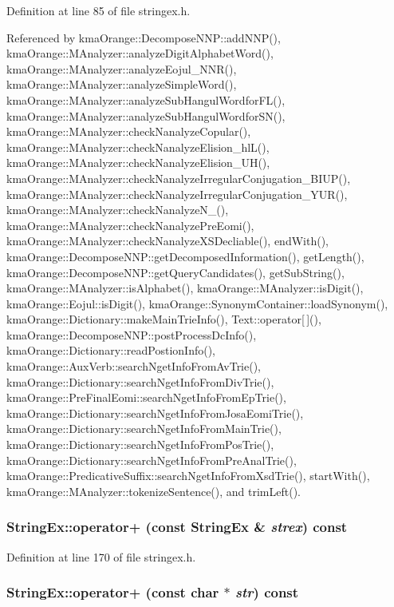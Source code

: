Definition at line 85 of file stringex.h.

Referenced by kmaOrange::DecomposeNNP::addNNP(), kmaOrange::MAnalyzer::analyzeDigitAlphabetWord(), kmaOrange::MAnalyzer::analyzeEojul\_\-NNR(), kmaOrange::MAnalyzer::analyzeSimpleWord(), kmaOrange::MAnalyzer::analyzeSubHangulWordforFL(), kmaOrange::MAnalyzer::analyzeSubHangulWordforSN(), kmaOrange::MAnalyzer::checkNanalyzeCopular(), kmaOrange::MAnalyzer::checkNanalyzeElision\_\-hlL(), kmaOrange::MAnalyzer::checkNanalyzeElision\_\-UH(), kmaOrange::MAnalyzer::checkNanalyzeIrregularConjugation\_\-BIUP(), kmaOrange::MAnalyzer::checkNanalyzeIrregularConjugation\_\-YUR(), kmaOrange::MAnalyzer::checkNanalyzeN\_\-(), kmaOrange::MAnalyzer::checkNanalyzePreEomi(), kmaOrange::MAnalyzer::checkNanalyzeXSDecliable(), endWith(), kmaOrange::DecomposeNNP::getDecomposedInformation(), getLength(), kmaOrange::DecomposeNNP::getQueryCandidates(), getSubString(), kmaOrange::MAnalyzer::isAlphabet(), kmaOrange::MAnalyzer::isDigit(), kmaOrange::Eojul::isDigit(), kmaOrange::SynonymContainer::loadSynonym(), kmaOrange::Dictionary::makeMainTrieInfo(), Text::operator\mbox{[}$\,$\mbox{]}(), kmaOrange::DecomposeNNP::postProcessDcInfo(), kmaOrange::Dictionary::readPostionInfo(), kmaOrange::AuxVerb::searchNgetInfoFromAvTrie(), kmaOrange::Dictionary::searchNgetInfoFromDivTrie(), kmaOrange::PreFinalEomi::searchNgetInfoFromEpTrie(), kmaOrange::Dictionary::searchNgetInfoFromJosaEomiTrie(), kmaOrange::Dictionary::searchNgetInfoFromMainTrie(), kmaOrange::Dictionary::searchNgetInfoFromPosTrie(), kmaOrange::Dictionary::searchNgetInfoFromPreAnalTrie(), kmaOrange::PredicativeSuffix::searchNgetInfoFromXsdTrie(), startWith(), kmaOrange::MAnalyzer::tokenizeSentence(), and trimLeft().\hypertarget{classStringEx_3aa53b601611b0c5e6e38021cc85b95f}{
\subsubsection[{operator+}]{ StringEx::operator+ (const {\bf StringEx} \& {\em strex}) const}}
\label{classStringEx_3aa53b601611b0c5e6e38021cc85b95f}




Definition at line 170 of file stringex.h.\hypertarget{classStringEx_91f1a574ee859923b7e78523196aff40}{
\subsubsection[{operator+}]{ StringEx::operator+ (const char $\ast$ {\em str}) const}}
\label{classStringEx_91f1a574ee859923b7e78523196aff40}




